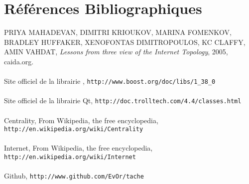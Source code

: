 \section*{R\'ef\'erences Bibliographiques}



\label{bib_3view}
PRIYA MAHADEVAN, DIMITRI KRIOUKOV, MARINA FOMENKOV, BRADLEY HUFFAKER, XENOFONTAS DIMITROPOULOS, KC CLAFFY, AMIN VAHDAT, \textit{Lessons from three view of the Internet Topology}, 2005, caida.org.\\
~\\
\label{bib_boost}
Site officiel de la librairie \boost, \verb|http://www.boost.org/doc/libs/1_38_0|\\
~\\
\label{bib_qt}
Site officiel de la librairie Qt, \verb|http://doc.trolltech.com/4.4/classes.html|\\
~\\
\label{bib_wiki_centrality}
Centrality, From Wikipedia, the free encyclopedia, \verb|http://en.wikipedia.org/wiki/Centrality|\\
~\\
\label{bib_wiki_internet}
Internet, From Wikipedia, the free encyclopedia, \verb|http://en.wikipedia.org/wiki/Internet|\\
~\\
\label{bib_github}
Github,
 \verb|http://www.github.com/EvOr/tache|